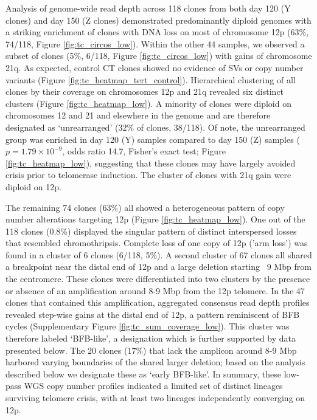 \documentclass[phd,tocprelim]{cornell}
\begin{document}
Analysis of genome-wide read depth across 118 clones from both day 120 (Y clones) and day 150 (Z clones) demonstrated predominantly diploid genomes with a striking enrichment of clones with DNA loss on most of chromosome 12p (63\%, 74/118, Figure \ref{fig:tc_circos_low}). Within the other 44 samples, we observed a subset of clones (5\%, 6/118, Figure \ref{fig:tc_circos_low}) with gains of chromosome 21q. As expected, control CT clones showed no evidence of SVs or copy number variants (Figure \ref{fig:tc_heatmap_tert_control}). Hierarchical clustering of all clones by their coverage on chromosomes 12p and 21q revealed six distinct clusters (Figure \ref{fig:tc_heatmap_low}). A minority of clones were diploid on chromosomes 12 and 21 and elsewhere in the genome and are therefore designated as ‘unrearranged’ (32\% of clones, 38/118). Of note, the unrearranged group was enriched in day 120 (Y) samples compared to day 150 (Z) samples ($p = 1.79 \times 10^{-9}$, odds ratio 14.7, Fisher’s exact test; Figure \ref{fig:tc_heatmap_low}), suggesting that these clones may have largely avoided crisis prior to telomerase induction. The cluster of clones with 21q gain were diploid on 12p.

The remaining 74 clones (63\%) all showed a heterogeneous pattern of copy number alterations targeting 12p (Figure \ref{fig:tc_heatmap_low}). One out of the 118 clones (0.8\%) displayed the singular pattern of distinct interspersed losses that resembled chromothripsis. Complete loss of one copy of 12p ('arm loss') was found in a cluster of 6 clones (6/118, 5\%). A second cluster of 67 clones all shared a breakpoint near the distal end of 12p and a large deletion starting ~9 Mbp from the centromere. These clones were differentiated into two clusters by the presence or absence of an amplification around 8-9 Mbp from the 12p telomere. In the 47 clones that contained this amplification, aggregated consensus read depth profiles revealed step-wise gains at the distal end of 12p, a pattern reminiscent of BFB cycles (Supplementary Figure \ref{fig:tc_sum_coverage_low}). This cluster was therefore labeled ‘BFB-like’, a designation which is further supported by data presented below. The 20 clones (17\%) that lack the amplicon around 8-9 Mbp harbored varying boundaries of the shared larger deletion; based on the analysis described below we designate these as ‘early BFB-like’. In summary, these low-pass WGS copy number profiles indicated a limited set of distinct lineages surviving telomere crisis, with at least two lineages independently converging on 12p.
\end{document}
